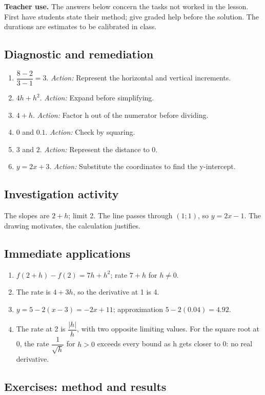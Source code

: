 \label{C04-CORR}
\textbf{Teacher use.} The answers below concern the tasks not worked in the lesson. First have students state their method; give graded help before the solution. The durations are estimates to be calibrated in class.
\subsection*{Diagnostic and remediation}
\begin{enumerate}
\item $\dfrac{8-2}{3-1}=3$. \textit{Action:} Represent the horizontal and vertical increments.
\item $4h+h^2$. \textit{Action:} Expand before simplifying.
\item $4+h$. \textit{Action:} Factor h out of the numerator before dividing.
\item $0$ and $0.1$. \textit{Action:} Check by squaring.
\item $3$ and $2$. \textit{Action:} Represent the distance to 0.
\item $y=2x+3$. \textit{Action:} Substitute the coordinates to find the y-intercept.
\end{enumerate}
\subsection*{Investigation activity}
The slopes are $2+h$; limit 2. The line passes through $(1;1)$, so $y=2x-1$. The drawing motivates, the calculation justifies.
\subsection*{Immediate applications}
\begin{enumerate}
\item $f(2+h)-f(2)=7h+h^2$; rate $7+h$ for $h\ne0$.
\item The rate is $4+3h$, so the derivative at 1 is 4.
\item $y=5-2(x-3)=-2x+11$; approximation $5-2(0.04)=4.92$.
\item The rate at 2 is $\dfrac{|h|}{h}$, with two opposite limiting values. For the square root at 0, the rate $\dfrac{1}{\sqrt h}$ for $h>0$ exceeds every bound as h gets closer to 0: no real derivative.
\end{enumerate}
\subsection*{Exercises: method and results}
